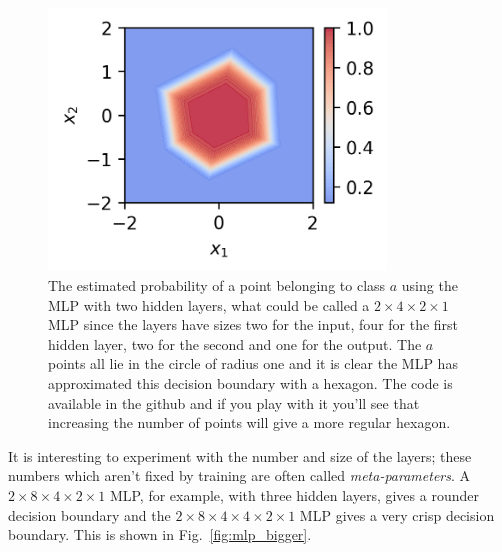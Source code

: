 \documentclass[12pt]{article}
\begin{document}
\begin{figure}[thb]
\begin{center}
  \includegraphics[width=0.8\textwidth]{two_layer_heatmap.png}
\end{center}
\caption{The estimated probability of a point belonging to class $a$
  using the MLP with two hidden layers, what could be called a
  $2\times 4\times 2\times 1$ MLP since the layers have sizes two for
  the input, four for the first hidden layer, two for the second and
  one for the output. The $a$ points all lie in the circle of radius
  one and it is clear the MLP has approximated this decision boundary
  with a hexagon. The code is available in the github and if you play
  with it you'll see that increasing the number of points will give a
  more regular hexagon.}\label{fig:mlp}
\end{figure}

It is interesting to experiment with the number and size of the
layers; these numbers which aren't fixed by training are often called
\textsl{meta-parameters}. A $2\times 8 \times 4\times 2\times 1$ MLP,
for example, with three hidden layers, gives a rounder decision boundary and the $2\times 8  \times 4\times 4\times 2\times 1$ MLP gives a very crisp decision boundary. This is shown in Fig.~\ref{fig:mlp_bigger}.
\end{document}
